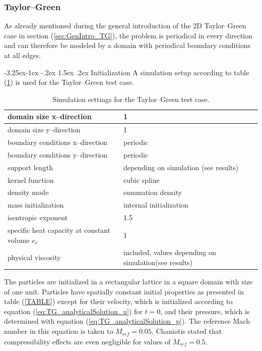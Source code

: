 \documentclass[11pt,a4paper,twoside]{report}
\makeatletter
\renewcommand\paragraph{\@startsection{paragraph}{4}{\z@}%
  {-3.25ex\@plus -1ex \@minus -.2ex}%
  {1.5ex \@plus .2ex}%
  {\normalfont\normalsize\bfseries}}
\makeatother
\begin{document}
\subsubsection{Taylor--Green}
\label{sec:SimuSetup_TG}
As already mentioned during the general introduction of the 2D Taylor--Green case in section (\ref{sec:GenIntro_TG}), the problem is periodical in every direction and can therefore be modeled by a domain with periodical boundary conditions at all edges.

\paragraph{Initialization}
A simulation setup according to table (\ref{tab:SimuSettings_TG}) is used for the Taylor--Green test case.

\begin{table}[h] %
\label{tab:SimuSettings_TG}
\centering

\begin{tabular}[c]{|l|p{5cm}|} %
\hline
\hline
domain size x--direction &  1\\
\hline
domain size y--direction &  1\\
\hline
boundary conditions x--direction & periodic\\
\hline
boundary conditions y--direction & periodic\\
\hline
support length & depending on simulation \newline (see results)  \\
\hline
kernel function & cubic spline \\
\hline
density mode & summation density \\
\hline
mass initialization & internal initialization \\
\hline
isentropic exponent & 1.5\\
\hline
specific heat capacity at constant volume $c_v$ & 1\\
\hline
physical viscosity& included, values depending on simulation\newline (see results)\\ 
\hline
\hline
\end{tabular}
\caption[]{Simulation settings for the Taylor--Green test case.}

\end{table}


The particles are initialized in a rectangular lattice in a square domain with size of one unit. Particles have spatially constant initial properties as presented in table (\ref{TABLE}) except for their velocity, which is initialized according to equation (\ref{eq:TG_analyticalSolution_u}) for $t=0$, and their pressure, which is determined with equation (\ref{eq:TG_analyticalSolution_p}). The reference Mach number in this equation is taken to $M_\mathit{ref}=0.05$. Chaniotis \cite{Chaniotis2002} stated that compressibility effects are even negligible for values of $M_\mathit{ref}=0.5$.
\end{document}

